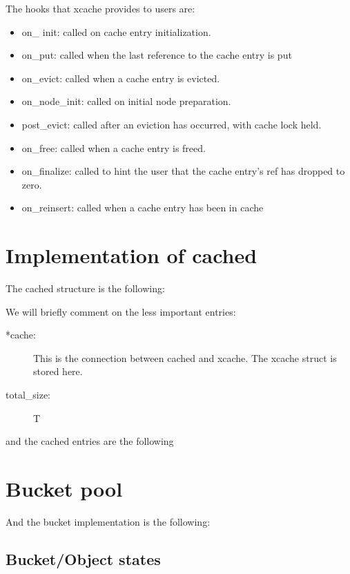The hooks that xcache provides to users are:

\begin{itemize}
	\item on\_ init: called on cache entry initialization.
	\item on\_put: called when the last reference to the cache entry is put
	\item on\_evict: called when a cache entry is evicted.
	\item on\_node\_init: called on initial node preparation.
	\item post\_evict: called after an eviction has occurred, with cache  
		lock held.
	\item on\_free: called when a cache entry is freed.
	\item on\_finalize: called to hint the user that the cache entry's ref 
		has dropped to zero.
	\item on\_reinsert: called when a cache entry has been in cache
\end{itemize}


\section{Implementation of cached}\label{sec:cached-imp}

The cached structure is the following:


We will briefly comment on the less important entries:

\begin{description}
	\item[*cache:]
		This is the connection between cached and xcache. The xcache struct is 
		stored here.
	\item[total\_size:]
		T
\end{description}

and the cached entries are the following


\section{Bucket pool}

And the bucket implementation is the following:


\subsection{Bucket/Object states}

